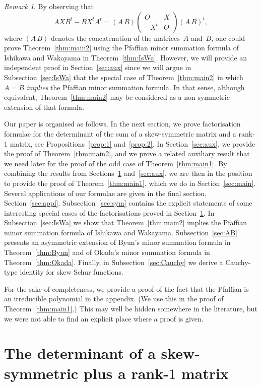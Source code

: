 \documentclass[12pt,reqno]{amsart}
\numberwithin{equation}{section}
\theoremstyle{definition}
\theoremstyle{remark}
\newtheorem{remark}[theorem]{Remark}
\begin{document}
\begin{remark}
By observing that
$$
AXB^t-BX^tA^t=(A\,B)\begin{pmatrix} 
O&X\\-X^t&O
\end{pmatrix}
(A\,B)^t,
$$
where $(A\,B)$ denotes the concatenation of the matrices~$A$ and~$B$,
one could prove Theorem~\ref{thm:main2} using the Pfaffian minor
summation formula of Ishikawa and Wakayama 
in Theorem~\ref{thm:IsWa}. However, we will
provide an independent proof in Section~\ref{sec:aux} since
we will argue in Subsection~\ref{sec:IsWa} that the special case
of Theorem~\ref{thm:main2} in which $A=B$
{\it implies} the Pfaffian minor summation formula.
In that sense, although equivalent,
Theorem~\ref{thm:main2} may be considered as a
non-symmetric extension of that formula.
\end{remark}

\medskip
Our paper is organised as follows. 
In the next section, we prove factorisation formulae for the
determinant of the sum of a skew-symmetric matrix and a rank-1 matrix,
see Propositions~\ref{prop:1} and~\ref{prop:2}. In
Section~\ref{sec:aux}, we provide the proof of
Theorem~\ref{thm:main2}, and we prove a related auxiliary result
that we need later for the proof of the odd case of
Theorem~\ref{thm:main1}. By combining the results from
Sections~\ref{sec:Y+M} and~\ref{sec:aux}, we are then in the position
to provide the proof of Theorem~\ref{thm:main1}, which we do in
Section~\ref{sec:main}. Several applications of our formulae are given
in the final section, Section~\ref{sec:appl}.
Subsection~\ref{sec:sym} contains the explicit statements of some
interesting special cases of the factorisations proved in
Section~\ref{sec:Y+M}. In Subsection~\ref{sec:IsWa} we show that
Theorem~\ref{thm:main2} implies the Pfaffian minor summation formula
of Ishikawa and Wakayama. Subsection~\ref{sec:AB} presents an asymmetric
extension of Byun's minor summation formula in
Theorem~\ref{thm:Byun} and of Okada's minor summation formula
in Theorem~\ref{thm:Okada}. 
Finally, in Subsection~\ref{sec:Cauchy} we
derive a Cauchy-type identity for skew Schur functions.

For the sake of completeness, we provide a proof of the fact that the
Pfaffian is an irreducible polynomial in the appendix. (We use this in
the proof of Theorem~\ref{thm:main1}.) This may well be hidden
somewhere in the literature, but we were not able to find an explicit
place where a proof is given.

\section{The determinant of a skew-symmetric plus a rank-$1$ matrix}
\label{sec:Y+M}
\end{document}
